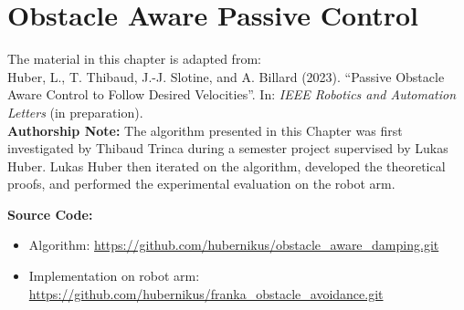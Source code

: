 \chapter{Obstacle Aware Passive Control} \label{chap:passivity_aware_damping}
% 
% 
\begin{publicationbox}
	The material in this chapter is adapted from: \\
	Huber, L., T. Thibaud, J.-J. Slotine, and A. Billard (2023). “Passive Obstacle Aware Control to Follow Desired Velocities”. In: \textit{IEEE Robotics and Automation Letters} (in preparation). \\

\textbf{Authorship Note:}
 The algorithm presented in this Chapter was first investigated by Thibaud Trinca during a semester project supervised by Lukas Huber.
 Lukas Huber then iterated on the algorithm, developed the theoretical proofs, and performed the experimental evaluation on the robot arm.

\textbf{Source Code:}
\begin{itemize}
	\setlength\itemsep{-0.0em}
\item Algorithm:
	\url{https://github.com/hubernikus/obstacle_aware_damping.git}
\item Implementation on robot arm: \\
	\url{https://github.com/hubernikus/franka_obstacle_avoidance.git} 
\end{itemize}


\end{publicationbox}

